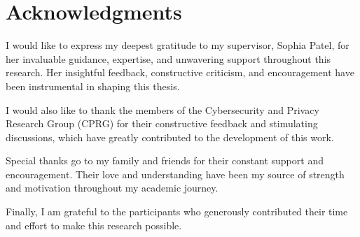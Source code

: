 \chapter*{Acknowledgments}

I would like to express my deepest gratitude to my supervisor, Sophia Patel, for her invaluable guidance, expertise, and unwavering support throughout this research. Her insightful feedback, constructive criticism, and encouragement have been instrumental in shaping this thesis.

I would also like to thank the members of the Cybersecurity and Privacy Research Group (CPRG) for their constructive feedback and stimulating discussions, which have greatly contributed to the development of this work.

Special thanks go to my family and friends for their constant support and encouragement. Their love and understanding have been my source of strength and motivation throughout my academic journey.

Finally, I am grateful to the participants who generously contributed their time and effort to make this research possible.

